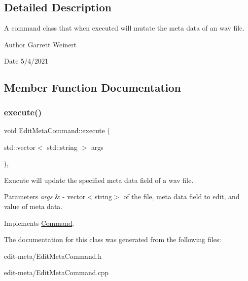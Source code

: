 \subsection{Detailed Description}
A command class that when executed will mutate the meta data of an wav file. \begin{DoxyAuthor}{Author}
Garrett Weinert 
\end{DoxyAuthor}
\begin{DoxyDate}{Date}
5/4/2021 
\end{DoxyDate}


\subsection{Member Function Documentation}
\mbox{\label{classEditMetaCommand_ae96350ba54b8e3f4f84dcb8eab8da522}} 
\subsubsection{\texorpdfstring{execute()}{execute()}}
{\footnotesize\ttfamily void Edit\+Meta\+Command\+::execute (\begin{DoxyParamCaption}\item[{std\+::vector$<$ std\+::string $>$}]{args }\end{DoxyParamCaption})\hspace{0.3cm}{\ttfamily [override]}, {\ttfamily [virtual]}}

Exucute will update the specified meta data field of a wav file. 
\begin{DoxyParams}{Parameters}
{\em args} & -\/ vector$<$string$>$ of the file, meta data field to edit, and value of meta data. \\
\hline
\end{DoxyParams}


Implements \hyperlink{classCommand}{Command}.



The documentation for this class was generated from the following files\+:\begin{DoxyCompactItemize}
\item 
edit-\/meta/Edit\+Meta\+Command.\+h\item 
edit-\/meta/Edit\+Meta\+Command.\+cpp\end{DoxyCompactItemize}
